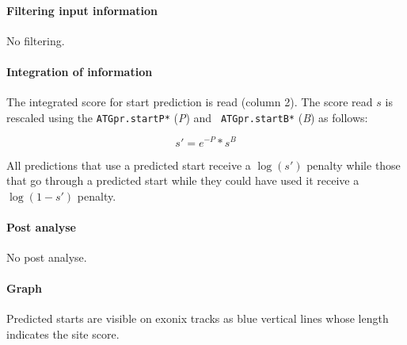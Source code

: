 \paragraph{Filtering input information}

No filtering.

\paragraph{Integration of information}

The integrated score for start prediction is read (column 2).  The
score read $s$ is rescaled using the {\tt ATGpr.startP*} (\emph{P}) and {\tt
ATGpr.startB*} (\emph{B}) as follows:

\[s' = e^{-P}*s^B\]

All predictions that use a predicted start receive a $\log(s')$
penalty while those that go through a predicted start while they
could have used it receive a $\log(1-s')$ penalty.


\paragraph{Post analyse}

No post analyse.

\paragraph{Graph}

Predicted starts are visible on exonix tracks as blue vertical lines
whose length indicates the site score.
